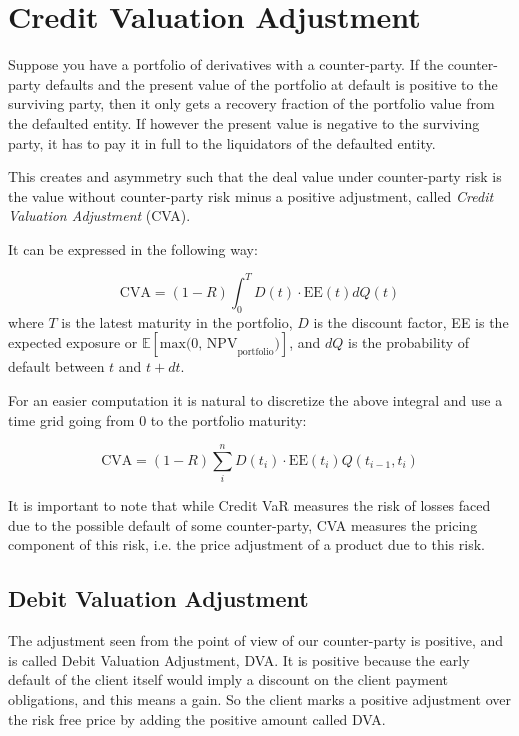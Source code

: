 \section{Credit Valuation Adjustment}
\label{credit-valuation-adjustment}

Suppose you have a portfolio of derivatives with a counter-party. 
If the counter-party defaults and the present value of the portfolio at
default is positive to the surviving party, then it only
gets a recovery fraction of the portfolio value from the defaulted entity. 
If however the present value is negative to the surviving party,
it has to pay it in full to the liquidators of the defaulted entity.

This creates and asymmetry such that the deal value under counter-party risk is
the value without counter-party risk minus a positive adjustment, called
\emph{Credit Valuation Adjustment} (CVA).

It can be expressed in the following way:

\begin{equation}
\text{CVA} = (1-R) \int_0^T D(t) \cdot \textrm{EE}(t) dQ(t)
\label{eq:cva}
\end{equation}
where $T$ is the latest maturity in the portfolio, $D$ is the discount factor, EE is the expected exposure or \(\mathbb{E}[\text{max(0, NPV}_\text{portfolio})]\), and $dQ$ is the probability of default between $t$ and $t+dt$.

For an easier computation it is natural to discretize the above integral
and use a time grid going from 0 to the portfolio maturity:

\begin{equation}
\text{CVA} = (1-R) \sum_i^n D(t_i) \cdot \mathrm{EE}(t_i) Q(t_{i-1}, t_i)
\label{eq:cva_discrete}
\end{equation}

It is important to note that while Credit VaR measures the risk of losses faced due to the possible default of some counter-party, CVA measures the pricing component of this risk, i.e. the price adjustment of a product due to this risk.

\subsection{Debit Valuation Adjustment}

The adjustment seen from the point of view of our counter-party is positive, and is called Debit Valuation Adjustment, DVA. It is positive because the early default of the client itself would imply a discount on the client payment obligations, and this means a gain. So the client marks a positive adjustment over the risk free price by adding the positive amount called DVA. 

